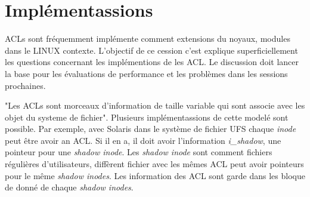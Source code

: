 \section{Implémentassions}


ACLs sont fréquemment implémente comment extensions du noyaux, modules dans le LINUX contexte. L'objectif de ce cession c'est explique superficiellement les questions concernant les implémentions de les ACL. Le discussion doit lancer la base pour les évaluations de performance et les problèmes dans les sessions prochaines.

"Les ACLs sont morceaux d'information de taille variable qui sont associe avec les objet du systeme de fichier"\cite{aclsuse}. Plusieurs implémentassions de cette modelé sont possible. Par exemple, avec Solaris dans le système de fichier UFS\cite{acl_permission} chaque \emph{inode} peut être avoir an ACL. Si il en a, il doit avoir l'information \emph{i\_shadow}, une pointeur pour une \emph{shadow inode}. Les \emph{shadow inode} sont comment fichiers régulières d'utilisateurs, diffèrent fichier avec les mêmes ACL peut avoir pointeurs pour le même \emph{shadow inodes}. Les information des ACL sont garde dans les bloque de donné de chaque \emph{shadow inodes}.




